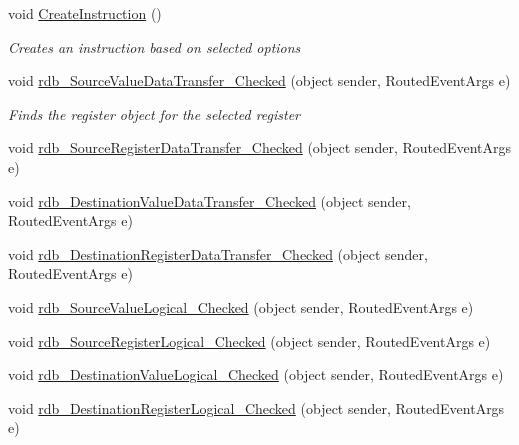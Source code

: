 \begin{DoxyCompactItemize}
void \hyperlink{class_c_p_u___o_s___simulator_1_1_instructions_window_aafdc8c843b7f2d0e4c434edc569923c6}{Create\+Instruction} ()
\begin{DoxyCompactList}\small\item\em Creates an instruction based on selected options \end{DoxyCompactList}\item 
void \hyperlink{class_c_p_u___o_s___simulator_1_1_instructions_window_adce5e32de39213723ea06d279681b8ea}{rdb\+\_\+\+Source\+Value\+Data\+Transfer\+\_\+\+Checked} (object sender, Routed\+Event\+Args e)
\begin{DoxyCompactList}\small\item\em Finds the register object for the selected register \end{DoxyCompactList}\item 
void \hyperlink{class_c_p_u___o_s___simulator_1_1_instructions_window_aec7d6be51c8cd95dce4db01a5c66047e}{rdb\+\_\+\+Source\+Register\+Data\+Transfer\+\_\+\+Checked} (object sender, Routed\+Event\+Args e)
\item 
void \hyperlink{class_c_p_u___o_s___simulator_1_1_instructions_window_a8572bfa72449f43f800dd55961ad7837}{rdb\+\_\+\+Destination\+Value\+Data\+Transfer\+\_\+\+Checked} (object sender, Routed\+Event\+Args e)
\item 
void \hyperlink{class_c_p_u___o_s___simulator_1_1_instructions_window_a61a12a00e2f822ca948b2216b5dd85db}{rdb\+\_\+\+Destination\+Register\+Data\+Transfer\+\_\+\+Checked} (object sender, Routed\+Event\+Args e)
\item 
void \hyperlink{class_c_p_u___o_s___simulator_1_1_instructions_window_ad1c6df35e2658c60a531a1f651f47434}{rdb\+\_\+\+Source\+Value\+Logical\+\_\+\+Checked} (object sender, Routed\+Event\+Args e)
\item 
void \hyperlink{class_c_p_u___o_s___simulator_1_1_instructions_window_af6e5871e2b68c4922775ea1f65309bac}{rdb\+\_\+\+Source\+Register\+Logical\+\_\+\+Checked} (object sender, Routed\+Event\+Args e)
\item 
void \hyperlink{class_c_p_u___o_s___simulator_1_1_instructions_window_ae4f933abbff92c008d38f9b3e9008315}{rdb\+\_\+\+Destination\+Value\+Logical\+\_\+\+Checked} (object sender, Routed\+Event\+Args e)
\item 
void \hyperlink{class_c_p_u___o_s___simulator_1_1_instructions_window_af0d373665806dc4e8798761c967ead81}{rdb\+\_\+\+Destination\+Register\+Logical\+\_\+\+Checked} (object sender, Routed\+Event\+Args e)
\item 

\end{DoxyCompactItemize}
